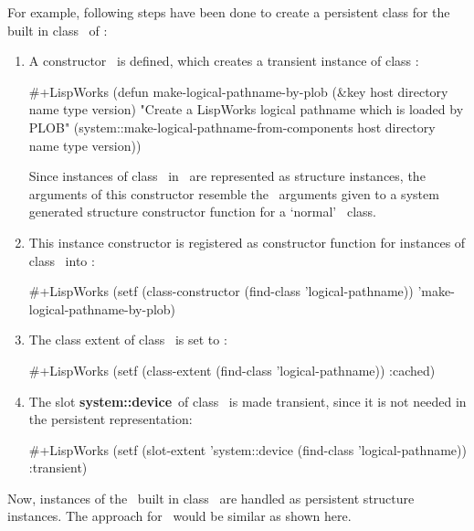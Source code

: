 For example, following steps have been done to create a persistent
class for the built in class \ of \lwcl:
\begin{enumerate}

\item A constructor \ is defined,
  which creates a transient instance of class
  :
\begin{CompactCode}
#+LispWorks
(defun make-logical-pathname-by-plob
     (&key host directory name type version)
  "Create a LispWorks logical pathname which is loaded by PLOB"
  (system::make-logical-pathname-from-components
   host directory name type version))
\end{CompactCode}

Since instances of class \ in \lwcl\ are
represented as structure instances, the arguments of this constructor
resemble the \ arguments given to a system generated
structure constructor function for a `normal' \ class.

\item This instance constructor is registered as constructor function
  for instances of class \ into \plobwoexcl:
\begin{CompactCode}
#+LispWorks
(setf (class-constructor (find-class 'logical-pathname))
      'make-logical-pathname-by-plob)
\end{CompactCode}

\item The class extent of class \ is set to
  :
\begin{CompactCode}
#+LispWorks
(setf (class-extent (find-class 'logical-pathname)) :cached)
\end{CompactCode}

\item The slot \textbf{system::device}\ of class
  \ is made transient, since it is not needed
  in the persistent representation:
\begin{CompactCode}
#+LispWorks
(setf (slot-extent 'system::device (find-class 'logical-pathname))
      :transient)
\end{CompactCode}

\end{enumerate}
Now, instances of the \lwcl\ built in class \ 
are handled as persistent structure instances. The approach for
\allegrocl\ would be similar as shown here.

